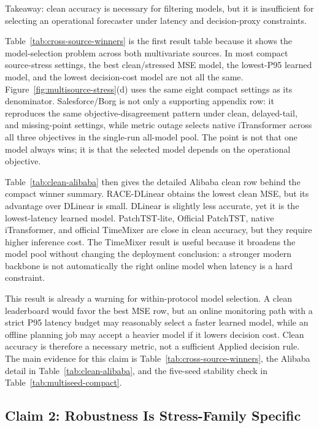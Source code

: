 \documentclass[conference]{IEEEtran}
\begin{document}
Takeaway: clean accuracy is necessary for filtering models, but it is insufficient for selecting an operational forecaster under latency and decision-proxy constraints.

Table~\ref{tab:cross-source-winners} is the first result table because it shows the model-selection problem across both multivariate sources. In most compact source-stress settings, the best clean/stressed MSE model, the lowest-P95 learned model, and the lowest decision-cost model are not all the same. Figure~\ref{fig:multisource-stress}(d) uses the same eight compact settings as its denominator. Salesforce/Borg is not only a supporting appendix row: it reproduces the same objective-disagreement pattern under clean, delayed-tail, and missing-point settings, while metric outage selects native iTransformer across all three objectives in the single-run all-model pool. The point is not that one model always wins; it is that the selected model depends on the operational objective.

Table~\ref{tab:clean-alibaba} then gives the detailed Alibaba clean row behind the compact winner summary. RACE-DLinear obtains the lowest clean MSE, but its advantage over DLinear is small. DLinear is slightly less accurate, yet it is the lowest-latency learned model. PatchTST-lite, Official PatchTST, native iTransformer, and official TimeMixer are close in clean accuracy, but they require higher inference cost. The TimeMixer result is useful because it broadens the model pool without changing the deployment conclusion: a stronger modern backbone is not automatically the right online model when latency is a hard constraint.

This result is already a warning for within-protocol model selection. A clean leaderboard would favor the best MSE row, but an online monitoring path with a strict P95 latency budget may reasonably select a faster learned model, while an offline planning job may accept a heavier model if it lowers decision cost. Clean accuracy is therefore a necessary metric, not a sufficient Applied decision rule. The main evidence for this claim is Table~\ref{tab:cross-source-winners}, the Alibaba detail in Table~\ref{tab:clean-alibaba}, and the five-seed stability check in Table~\ref{tab:multiseed-compact}.



\subsection{Claim 2: Robustness Is Stress-Family Specific}
\end{document}
